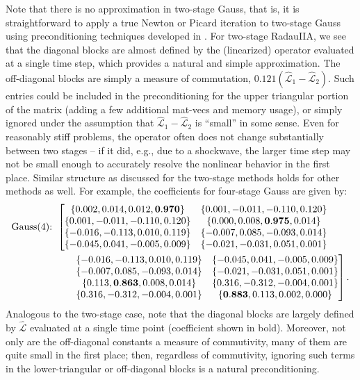 \documentclass[review]{siamart}
\begin{document}
Note that there is no approximation in two-stage Gauss, that is, it is
straightforward to apply a true Newton or Picard iteration to two-stage
Gauss using preconditioning techniques developed in .
For two-stage RadauIIA, we see that the diagonal blocks are almost
defined by the (linearized) operator evaluated at a single time step, which
provides a natural and simple approximation. The off-diagonal blocks are
simply a measure of commutation, $0.121(\widehat{\mathcal{L}}_1 - \widehat{\mathcal{L}}_2)$.
Such entries could be included in the preconditioning for the upper
triangular portion of the matrix (adding a few additional mat-vecs and
memory usage), or simply ignored under the assumption that $\widehat{\mathcal{L}}_1 -
\widehat{\mathcal{L}}_2$ is ``small'' in some sense. Even for reasonably stiff 
problems, the operator often does not change substantially between
two stages -- if it did, e.g., due to a shockwave, the larger time step
may not be small enough to accurately resolve the nonlinear behavior in
the first place. Similar structure as discussed for the two-stage methods
holds for other methods as well. For example, the coefficients for four-stage
Gauss are given by:
%
\begin{align*}
\textnormal{Gauss(4):}& \hspace{1ex}
\left[\begin{matrix}
\{0.002,0.014,0.012,\mathbf{0.970}\} & \{0.001,-0.011,-0.110,0.120\} \\
\{0.001,-0.011,-0.110,0.120\} & \{0.000,0.008,\mathbf{0.975},0.014\} \\
\{-0.016,-0.113,0.010,0.119\} & \{-0.007,0.085,-0.093,0.014\} \\
\{-0.045,0.041,-0.005,0.009\} & \{-0.021,-0.031,0.051,0.001\}
\end{matrix}\right.
\\&\hspace{5ex}
\left.\begin{matrix}
\{-0.016,-0.113,0.010,0.119\} & \{-0.045,0.041,-0.005,0.009\}\\
\{-0.007,0.085,-0.093,0.014\} & \{-0.021,-0.031,0.051,0.001\}\\
\{0.113,\mathbf{0.863},0.008,0.014\} & \{0.316,-0.312,-0.004,0.001\}\\
\{0.316,-0.312,-0.004,0.001\} & \{\mathbf{0.883},0.113,0.002,0.000\}\\
\end{matrix}\right].
\end{align*}
%
Analogous to the two-stage case, note that the diagonal blocks are largely
defined by $\widehat{\mathcal{L}}$ evaluated at a single time point (coefficient
shown in bold). Moreover, not only are the off-diagonal constants
a measure of commutivity, many of them are quite small in the first place;
then, regardless of commutivity, ignoring such terms in the lower-triangular
or off-diagonal blocks is a natural preconditioning. 
\end{document}
